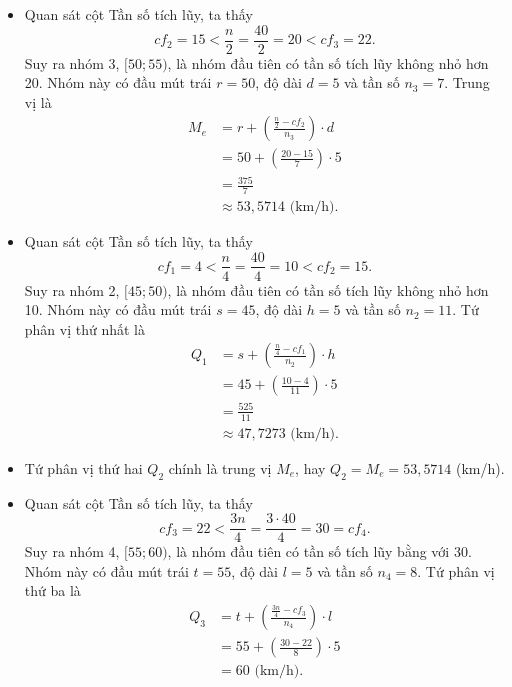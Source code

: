 \documentclass[
  letterpaper,
  DIV=11,
  numbers=noendperiod]{scrartcl}
\providecommand{\tightlist}{%
  \setlength{\itemsep}{0pt}\setlength{\parskip}{0pt}}\usepackage{longtable,booktabs,array}
\begin{document}
\begin{itemize}
\tightlist
\item
  Quan sát cột Tần số tích lũy, ta thấy \[
    cf_2=15 < \frac{n}{2}=\frac{40}{2}=20 < cf_3=22.
  \] Suy ra nhóm 3, \([50;55)\), là nhóm đầu tiên có tần số tích lũy
  không nhỏ hơn 20. Nhóm này có đầu mút trái \(r=50\), độ dài \(d=5\) và
  tần số \(n_3=7\). Trung vị là \begin{align*}
        M_e
            & = r+\left(\frac{\frac{n}{2}-cf_2}{n_3}\right)\cdot d \\
            & = 50 + \left(\frac{20-15}{7}\right)\cdot 5 \\
            & = \frac{375}{7} \\
            & \approx 53,5714 \text{ (km/h).}
    \end{align*}
\end{itemize}

\begin{itemize}
\item
  Quan sát cột Tần số tích lũy, ta thấy \[
  cf_1=4 < \frac{n}{4}=\frac{40}{4}=10 < cf_2=15.
  \] Suy ra nhóm 2, \([45;50)\), là nhóm đầu tiên có tần số tích lũy
  không nhỏ hơn 10. Nhóm này có đầu mút trái \(s=45\), độ dài \(h=5\) và
  tần số \(n_2=11\). Tứ phân vị thứ nhất là \begin{align*}
        Q_1
            & = s + \left( \frac{\frac{n}{4}-cf_1}{n_2}\right)\cdot h \\
            & = 45 + \left(\frac{10-4}{11}\right)\cdot 5 \\
            & = \frac{525}{11} \\
            & \approx 47,7273 \text{ (km/h).}
    \end{align*}
\item
  Tứ phân vị thứ hai \(Q_2\) chính là trung vị \(M_e\), hay
  \(Q_2 = M_e = 53,5714\) (km/h).
\end{itemize}

\begin{itemize}
\tightlist
\item
  Quan sát cột Tần số tích lũy, ta thấy \[
  cf_3=22 < \frac{3n}{4} = \frac{3 \cdot 40}{4} = 30 = cf_4.
  \] Suy ra nhóm 4, \([55;60)\), là nhóm đầu tiên có tần số tích lũy
  bằng với 30. Nhóm này có đầu mút trái \(t=55\), độ dài \(l=5\) và tần
  số \(n_4=8\). Tứ phân vị thứ ba là \begin{align*}
        Q_3
            & = t + \left(\frac{\frac{3n}{4}-cf_3}{n_4}\right)\cdot l \\
            & = 55 + \left(\frac{30-22}{8}\right)\cdot 5 \\
            & = 60 \text{ (km/h).}
    \end{align*}
\end{itemize}
\end{document}
